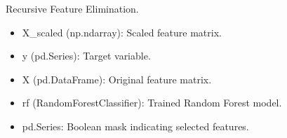 \documentclass[letterpaper,10pt,english]{sphinxmanual}
\begin{document}
\begin{fulllineitems}
\label{\detokenize{eda:eda.rfe_selection}}
\pysigstartsignatures
{}
\pysigstopsignatures
\sphinxAtStartPar
Recursive Feature Elimination.
\begin{description}
\begin{itemize}
\item {} 
\sphinxAtStartPar
X\_scaled (np.ndarray): Scaled feature matrix.

\item {} 
\sphinxAtStartPar
y (pd.Series): Target variable.

\item {} 
\sphinxAtStartPar
X (pd.DataFrame): Original feature matrix.

\item {} 
\sphinxAtStartPar
rf (RandomForestClassifier): Trained Random Forest model.

\end{itemize}

\begin{itemize}
\item {} 
\sphinxAtStartPar
pd.Series: Boolean mask indicating selected features.

\end{itemize}

\end{description}

\end{fulllineitems}

\end{document}
